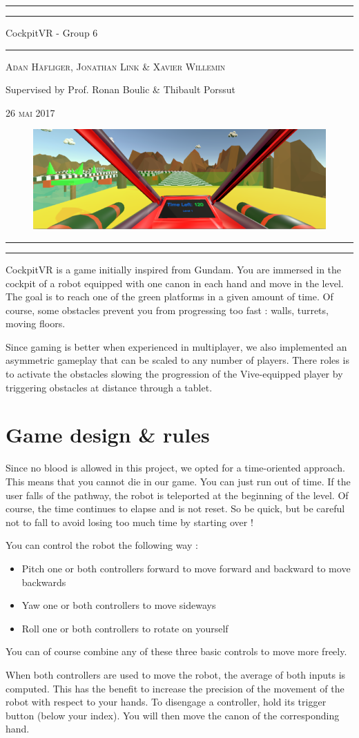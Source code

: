 \documentclass[12pt]{article}
\newcommand{\titleAT}{\begingroup %
\newlength{\drop} %
\drop=0.07\textheight %

\rule{\textwidth}{1pt}\par %
\vspace{2pt}\vspace{-\baselineskip} %
\rule{\textwidth}{0.4pt}\par %

\vspace{\drop} %
\centering %

{\Huge CockpitVR - Group 6}\\ %

\vspace{\drop} %
\rule{0.3\textwidth}{0.4pt}\par %
\vspace{\drop} %

\bigskip

{\large \textsc{Adan Häfliger, Jonathan Link \& Xavier Willemin}}\par %
{\Small Supervised by Prof. Ronan Boulic \& Thibault Porssut}\par %

\bigskip
\bigskip

{\small \textsc{26 mai 2017}}\par %

\vfill %

\begin{figure}[!h]
	\centering
	\includegraphics[scale=1.25]{images/cover.png}
\end{figure}

\bigskip
\bigskip
\bigskip
\bigskip

\rule{\textwidth}{0.4pt}\par %
\vspace{2pt}\vspace{-\baselineskip} %
\rule{\textwidth}{1pt}\par %

\thispagestyle{empty}

\endgroup}
\begin{document}
\titleAT

\newpage

\tableofcontents

\newpage

CockpitVR is a game initially inspired from Gundam. You are immersed in the cockpit of a robot equipped with one canon in each hand and move in the level. The goal is to reach one of the green platforms in a given amount of time. Of course, some obstacles prevent you from progressing too fast : walls, turrets, moving floors.

Since gaming is better when experienced in multiplayer, we also implemented an asymmetric gameplay that can be scaled to any number of players. There roles is to activate the obstacles slowing the progression of the Vive-equipped player by triggering obstacles at distance through a tablet.

\section{Game design \& rules}

Since no blood is allowed in this project, we opted for a time-oriented approach. This means that you cannot die in our game. You can just run out of time. If the user falls of the pathway, the robot is teleported at the beginning of the level. Of course, the time continues to elapse and is not reset. So be quick, but be careful not to fall to avoid losing too much time by starting over !

You can control the robot the following way :

\begin{itemize}
	\item Pitch one or both controllers forward to move forward and backward to move backwards
	\item Yaw one or both controllers to move sideways
	\item Roll one or both controllers to rotate on yourself
\end{itemize}

You can of course combine any of these three basic controls to move more freely.

When both controllers are used to move the robot, the average of both inputs is computed. This has the benefit to increase the precision of the movement of the robot with respect to your hands. To disengage a controller, hold its trigger button (below your index). You will then move the canon of the corresponding hand.
\end{document}
